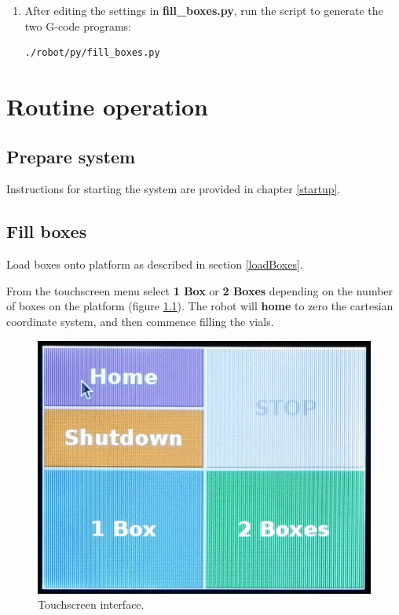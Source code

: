 \documentclass[]{book}
\theoremstyle{definition}
\theoremstyle{definition}
\theoremstyle{definition}
\theoremstyle{remark}
\begin{document}
\begin{enumerate}
\def\labelenumi{\arabic{enumi}.}
\setcounter{enumi}{2}
\item
  After editing the settings in \textbf{fill\_boxes.py}, run the script
  to generate the two G-code programs:

\begin{verbatim}
./robot/py/fill_boxes.py
\end{verbatim}
\end{enumerate}

\chapter{Routine operation}\label{operation}

\section{Prepare system}\label{prepare-system}

Instructions for starting the system are provided in chapter
\ref{startup}.

\section{Fill boxes}\label{fill-boxes}

Load boxes onto platform as described in section \ref{loadBoxes}.

From the touchscreen menu select \textbf{1 Box} or \textbf{2 Boxes}
depending on the number of boxes on the platform (figure
\ref{fig:touchscreen}). The robot will \textbf{home} to zero the
cartesian coordinate system, and then commence filling the vials.

\begin{figure}

{\centering \includegraphics[width=0.6\linewidth]{images/gui} 

}

\caption{Touchscreen interface.}\label{fig:touchscreen}
\end{figure}
\end{document}
